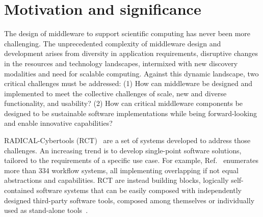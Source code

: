 \documentclass[preprint,12pt, a4paper]{elsarticle}
\begin{document}
\section{Motivation and significance}\label{sec:motivation}


The design of middleware to support scientific computing has never been more
challenging. The unprecedented complexity of middleware design and development
arises from diversity in application requirements, disruptive changes in the
resources and technology landscapes, intermixed with new discovery modalities
and need for scalable computing. Against this dynamic landscape, two critical
challenges must be addressed: (1) How can middleware be designed and implemented
to meet the collective challenges of scale, new and diverse functionality, and
usability? (2) How can critical middleware components be designed to be
sustainable software implementations while being forward-looking and enable
innovative capabilities?

RADICAL-Cybertools (RCT)~\cite{github-rct} are a set of systems developed to
address those challenges. An increasing trend is to develop single-point
software solutions, tailored to the requirements of a specific use case. For
example, Ref.~\cite{workflow-systems-url} enumerates more than 334 workflow
systems, all implementing overlapping if not equal abstractions and
capabilities. RCT are instead building blocks, logically self-contained software
systems that can be easily composed with independently designed third-party
software tools, composed among themselves or individually used as stand-alone
tools~\cite{turilli2019middleware}.
\end{document}
